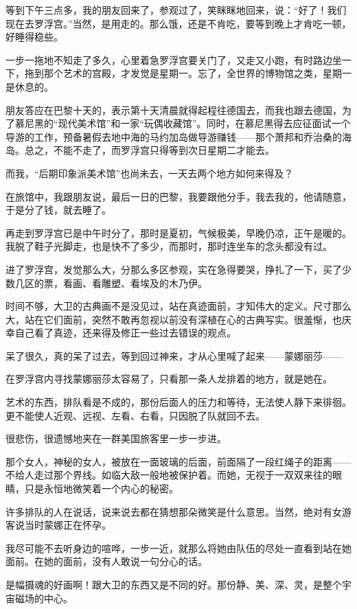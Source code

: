\par 等到下午三点多，我的朋友回来了，参观过了，笑眯眯地回来，说：“好了！我们现在去罗浮宫。”当然，是用走的。那么饿，还是不肯吃，要等到晚上才肯吃一顿，好睡得稳些。
\par 一步一拖地不知走了多久，心里着急罗浮宫要关门了，又走又小跑，有时路边坐一下，拖到那个艺术的宫殿，才发觉是星期一。忘了，全世界的博物馆之类，星期一是休息的。
\par 朋友答应在巴黎十天的，表示第十天清晨就得起程往德国去，而我也跟去德国，为了慕尼黑的“现代美术馆”和一家“玩偶收藏馆”。同时，在慕尼黑得去应征面试一个导游的工作，预备暑假去地中海的马约加岛做导游赚钱——那个萧邦和乔治桑的海岛。总之，不能不走了，而罗浮宫只得等到次日星期二才能去。
\par 而我，“后期印象派美术馆”也尚未去，一天去两个地方如何来得及？
\par 在旅馆中，我跟朋友说，最后一日的巴黎，我要跟他分手，我去我的，他请随意，于是分了钱，就去睡了。
\par 再走到罗浮宫已是中午时分了，那时是夏初，气候极美，早晚仍凉，正午是暖的。我脱了鞋子光脚走，也是快不了多少，而那时，那时连坐车的念头都没有过。
\par 进了罗浮宫，发觉那么大，分那么多区参观，实在急得要哭，挣扎了一下，买了少数几区的票，看画、看雕塑、看埃及的木乃伊。
\par 时间不够，大卫的古典画不是没见过，站在真迹面前，才知伟大的定义。尺寸那么大，站在它们面前，突然不敢再忽视以前没有深植在心的古典写实。很羞惭，也庆幸自己看了真迹，还来得及修正一些过去错误的观点。
\par 呆了很久，真的呆了过去，等到回过神来，才从心里喊了起来——蒙娜丽莎——
\par 在罗浮宫内寻找蒙娜丽莎太容易了，只看那一条人龙排着的地方，就是她在。
\par 艺术的东西，排队看是不成的，那份后面人的压力和等待，无法使人静下来徘徊。更不能使人近观、远视、左看、右看，只因脱了队就回不去。
\par 很悲伤，很遗憾地夹在一群美国旅客里一步一步进。
\par 那个女人，神秘的女人，被放在一面玻璃的后面，前面隔了一段红绳子的距离——不给人走过那个界线。如临大敌一般地被保护着。而她，无视于一双双来往的眼睛，只是永恒地微笑着一个内心的秘密。
\par 许多排队的人在说话，说来说去都在猜想那朵微笑是什么意思。当然，绝对有女游客说当时蒙娜正在怀孕。
\par 我尽可能不去听身边的喧哗，一步一近，就那么将她由队伍的尽处一直看到站在她面前。在她的面前，没有人敢说一句分心的话。
\par 是幅摄魂的好画啊！跟大卫的东西又是不同的好。那份静、美、深、灵，是整个宇宙磁场的中心。
